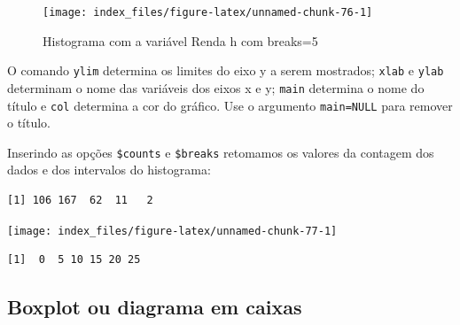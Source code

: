 \documentclass[12pt,brazil,oneside]{book}
\newenvironment{Shaded}{\begin{snugshade}}{\end{snugshade}}
\newcommand{\DataTypeTok}[1]{\textcolor[rgb]{0.13,0.29,0.53}{#1}}
\newcommand{\DecValTok}[1]{\textcolor[rgb]{0.00,0.00,0.81}{#1}}
\newcommand{\KeywordTok}[1]{\textcolor[rgb]{0.13,0.29,0.53}{\textbf{#1}}}
\newcommand{\NormalTok}[1]{#1}
\newcommand{\OperatorTok}[1]{\textcolor[rgb]{0.81,0.36,0.00}{\textbf{#1}}}
\newcommand{\StringTok}[1]{\textcolor[rgb]{0.31,0.60,0.02}{#1}}
\begin{document}
\begin{figure}[H]

{\centering \texttt{[image: index\_files/figure-latex/unnamed-chunk-76-1]} 

}

\caption{Histograma com a variável Renda h com breaks=5}\label{fig:unnamed-chunk-76}
\end{figure}

O comando \texttt{ylim} determina os limites do eixo y a serem mostrados; \texttt{xlab} e \texttt{ylab} determinam o nome das variáveis dos eixos x e y; \texttt{main} determina o nome do título e \texttt{col} determina a cor do gráfico. Use o argumento \texttt{main=NULL} para remover o título.

Inserindo as opções \texttt{\$counts} e \texttt{\$breaks} retomamos os valores da contagem dos dados e dos intervalos do histograma:

\begin{Shaded}
\end{Shaded}

\begin{verbatim}
[1] 106 167  62  11   2
\end{verbatim}

\begin{Shaded}
\end{Shaded}

\begin{center}\texttt{[image: index\_files/figure-latex/unnamed-chunk-77-1]} \end{center}

\begin{verbatim}
[1]  0  5 10 15 20 25
\end{verbatim}

\hypertarget{boxplot-ou-diagrama-em-caixas}{%
\subsection{Boxplot ou diagrama em caixas}\label{boxplot-ou-diagrama-em-caixas}}
\end{document}
